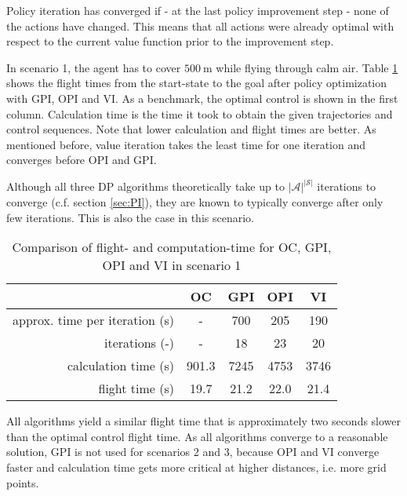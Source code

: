Policy iteration has converged if - at the last policy improvement step - none of the actions have changed. This means that all actions were already optimal with respect to the current value function prior to the improvement step.

In scenario 1, the agent has to cover $500~\text{m}$ while flying through calm air. Table \ref{tab:2d_flight_data_500m} shows the flight times from the start-state to the goal after policy optimization with GPI, OPI and VI. As a benchmark, the optimal control  is shown in the first column. Calculation time is the time it took to obtain the given trajectories and control sequences. Note that lower calculation and flight times are better. As mentioned before, value iteration takes the least time for one iteration and converges before OPI and GPI.

Although all three DP algorithms theoretically take up to $|\mathcal{A}|^{|\mathcal{S}|}$ iterations to converge (c.f. section \ref{sec:PI}), they are known to typically converge after only few iterations. This is also the case in this scenario.

\begin{table}[h]
	\begin{center}
		\begin{tabular}{r|c c c c}
			 & OC & GPI & OPI & VI \\ \hline
			approx. time per iteration (s) & - & 700 & 205 & 190 \\
			iterations (-) & - & 18 & 23 & 20 \\
			calculation time (s) & 901.3 & 7245 & 4753 & 3746 \\
			flight time (s) & 19.7 & 21.2 & 22.0  & 21.4
		\end{tabular}
		\caption{Comparison of flight- and computation-time for OC, GPI, OPI and VI in scenario 1}
		\label{tab:2d_flight_data_500m}
	\end{center}
\end{table}

All algorithms yield a similar flight time that is approximately two seconds slower than the optimal control flight time. As all algorithms converge to a reasonable solution, GPI is not used for scenarios 2 and 3, because OPI and VI converge faster and calculation time gets more critical at higher distances, i.e. more grid points.

\dataOPTIfiveH

